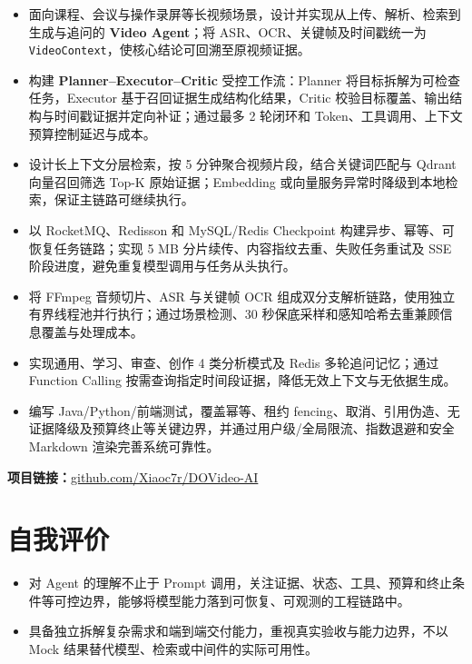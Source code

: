 \documentclass[10.5pt,a4paper]{ctexart}
\begin{document}
\begin{itemize}
    \item 面向课程、会议与操作录屏等长视频场景，设计并实现从上传、解析、检索到生成与追问的 \textbf{Video Agent}；将 ASR、OCR、关键帧及时间戳统一为 \texttt{VideoContext}，使核心结论可回溯至原视频证据。
    \item 构建 \textbf{Planner--Executor--Critic} 受控工作流：Planner 将目标拆解为可检查任务，Executor 基于召回证据生成结构化结果，Critic 校验目标覆盖、输出结构与时间戳证据并定向补证；通过最多 2 轮闭环和 Token、工具调用、上下文预算控制延迟与成本。
    \item 设计长上下文分层检索，按 5 分钟聚合视频片段，结合关键词匹配与 Qdrant 向量召回筛选 Top-K 原始证据；Embedding 或向量服务异常时降级到本地检索，保证主链路可继续执行。
    \item 以 RocketMQ、Redisson 和 MySQL/Redis Checkpoint 构建异步、幂等、可恢复任务链路；实现 5 MB 分片续传、内容指纹去重、失败任务重试及 SSE 阶段进度，避免重复模型调用与任务从头执行。
    \item 将 FFmpeg 音频切片、ASR 与关键帧 OCR 组成双分支解析链路，使用独立有界线程池并行执行；通过场景检测、30 秒保底采样和感知哈希去重兼顾信息覆盖与处理成本。
    \item 实现通用、学习、审查、创作 4 类分析模式及 Redis 多轮追问记忆；通过 Function Calling 按需查询指定时间段证据，降低无效上下文与无依据生成。
    \item 编写 Java/Python/前端测试，覆盖幂等、租约 fencing、取消、引用伪造、无证据降级及预算终止等关键边界，并通过用户级/全局限流、指数退避和安全 Markdown 渲染完善系统可靠性。
\end{itemize}

\textbf{项目链接：}\href{https://github.com/Xiaoc7r/DOVideo-AI}{github.com/Xiaoc7r/DOVideo-AI}

\section{自我评价}
\begin{itemize}
    \item 对 Agent 的理解不止于 Prompt 调用，关注证据、状态、工具、预算和终止条件等可控边界，能够将模型能力落到可恢复、可观测的工程链路中。
    \item 具备独立拆解复杂需求和端到端交付能力，重视真实验收与能力边界，不以 Mock 结果替代模型、检索或中间件的实际可用性。
\end{itemize}
\end{document}
